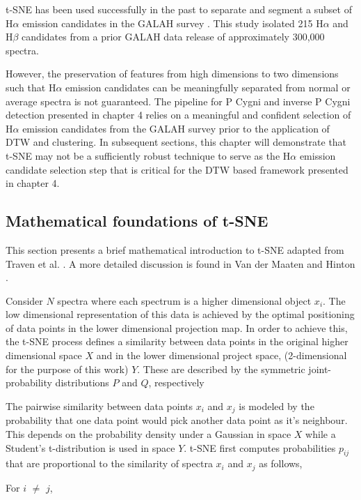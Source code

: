 t-SNE has been used successfully in the past to separate and segment a subset of H$\alpha$ emission candidates in the GALAH survey \cite{traven2017galah}. This study isolated 215 H$\alpha$ and H$\beta$ candidates from a prior GALAH data release of approximately 300,000 spectra. 

However, the preservation of features from high dimensions to two dimensions such that H$\alpha$ emission candidates can be meaningfully separated from normal or average spectra is not guaranteed. The pipeline for P Cygni and inverse P Cygni detection presented in chapter 4 relies on a meaningful and confident selection of H$\alpha$ emission candidates from the GALAH survey prior to the application of DTW and clustering. In subsequent sections, this chapter will demonstrate that t-SNE may not be a sufficiently robust technique to serve as the H$\alpha$ emission candidate selection step that is critical for the DTW based framework presented in chapter 4.

\subsection{Mathematical foundations of t-SNE}

This section presents a brief mathematical introduction to t-SNE adapted from Traven et al. \cite{traven2017galah}. A more detailed discussion is found in Van der Maaten and Hinton \cite{van2008visualizing}. 

Consider $N$ spectra where each spectrum is a higher dimensional object $x_i$. The low dimensional representation of this data is achieved by the optimal positioning of data points in the lower dimensional projection map. In order to achieve this, the t-SNE process defines a similarity between data points in the original higher dimensional space $X$ and in the lower dimensional project space, (2-dimensional for the purpose of this work) $Y$. These are described by the symmetric joint-
probability distributions $P$ and $Q$, respectively

The pairwise similarity between data points $x_i$ and $x_j$ is modeled by the probability that one data point would pick another data point as it's neighbour. This depends on the probability density under a Gaussian in space $X$ while a Student's t-distribution is used in space $Y$. t-SNE first computes probabilities $p_{ij}$ that are proportional to the similarity of spectra $x_i$ and $x_j$ as follows,


For $i$ $\neq$ $j$,

